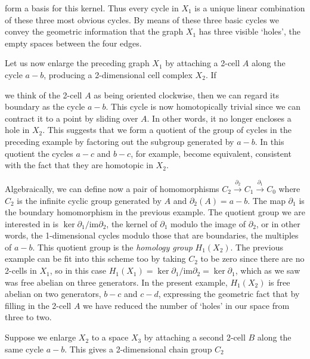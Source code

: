 form a basis for this kernel. Thus every cycle in $X_1$ is a unique linear combination of
these three most obvious cycles. By means of these three basic cycles we convey the
geometric information that the graph $X_1$ has three visible `holes', the empty spaces
between the four edges.

Let us now enlarge the preceding graph $X_1$ by attaching a 2-cell $A$ along the
cycle $a - b$, producing a 2-dimensional cell complex $X_2$. If

we think of the 2-cell $A$ as being oriented clockwise, then
we can regard its boundary as the cycle $a - b$. This cycle is
now homotopically trivial since we can contract it to a point
by sliding over $A$. In other words, it no longer encloses a
hole in $X_2$. This suggests that we form a quotient of the
group of cycles in the preceding example by factoring out
the subgroup generated by $a - b$. In this quotient the cycles $a - c$ and $b - c$, for
example, become equivalent, consistent with the fact that they are homotopic in $X_2$.

Algebraically, we can define now a pair of homomorphisms $C_2 \xrightarrow{\partial_2} C_1 \xrightarrow{\partial_1} C_0$
where $C_2$ is the infinite cyclic group generated by $A$ and $\partial_2(A) = a - b$. The map
$\partial_1$ is the boundary homomorphism in the previous example. The quotient group we
are interested in is $\ker \partial_1 / \text{im} \partial_2$, the kernel of $\partial_1$ modulo the image of $\partial_2$, or in other
words, the 1-dimensional cycles modulo those that are boundaries, the multiples of
$a - b$. This quotient group is the \textit{homology group} $H_1(X_2)$. The previous example can
be fit into this scheme too by taking $C_2$ to be zero since there are no 2-cells in $X_1$,
so in this case $H_1(X_1) = \ker \partial_1 / \text{im} \partial_2 = \ker \partial_1$, which as we saw was free abelian on
three generators. In the present example, $H_1(X_2)$ is free abelian on two generators,
$b - c$ and $c - d$, expressing the geometric fact that by filling in the 2-cell $A$ we have
reduced the number of `holes' in our space from three to two.

Suppose we enlarge $X_2$ to a space $X_3$ by attaching a second 2-cell $B$ along the
same cycle $a - b$. This gives a 2-dimensional chain group $C_2$

